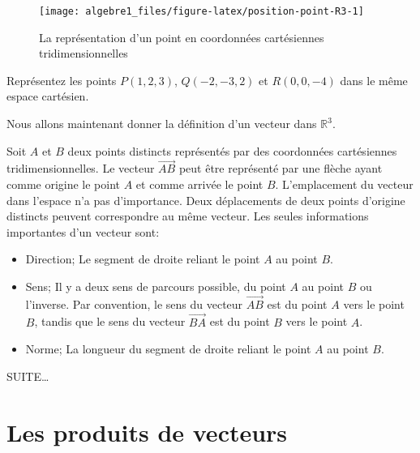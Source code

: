 \documentclass[]{book}
\providecommand{\tightlist}{%
  \setlength{\itemsep}{0pt}\setlength{\parskip}{0pt}}
\theoremstyle{definition}
\theoremstyle{definition}
\theoremstyle{definition}
\theoremstyle{remark}
\let\BeginKnitrBlock\begin \let\EndKnitrBlock\end
\begin{document}
\begin{figure}

{\centering \texttt{[image: algebre1\_files/figure-latex/position-point-R3-1]} 

}

\caption{La représentation d'un point en coordonnées cartésiennes tridimensionnelles}\label{fig:position-point-R3}
\end{figure}

\BeginKnitrBlock{example}
\protect\hypertarget{exm:unnamed-chunk-178}{}{\label{exm:unnamed-chunk-178} }Représentez les points \(P(1,2,3)\), \(Q(-2,-3,2)\) et \(R(0,0,-4)\) dans le même espace cartésien.
\EndKnitrBlock{example}

Nous allons maintenant donner la définition d'un vecteur dans \(\mathbb{R}^3\).

\BeginKnitrBlock{definition}[Les vecteurs de $\mathbb{R}^3$]
\protect\hypertarget{def:unnamed-chunk-179}{}{\label{def:unnamed-chunk-179} {} }Soit \(A\) et \(B\) deux points distincts représentés par des coordonnées cartésiennes tridimensionnelles. Le vecteur \(\overrightarrow{AB}\) peut être représenté par une flèche ayant comme origine le point \(A\) et comme arrivée le point \(B\). L'emplacement du vecteur dans l'espace n'a pas d'importance. Deux déplacements de deux points d'origine distincts peuvent correspondre au même vecteur. Les seules informations importantes d'un vecteur sont:

\begin{itemize}
\tightlist
\item
  Direction; Le segment de droite reliant le point \(A\) au point \(B\).
\item
  Sens; Il y a deux sens de parcours possible, du point \(A\) au point \(B\) ou l'inverse. Par convention, le sens du vecteur \(\overrightarrow{AB}\) est du point \(A\) vers le point \(B\), tandis que le sens du vecteur \(\overrightarrow{BA}\) est du point \(B\) vers le point \(A\).
\item
  Norme; La longueur du segment de droite reliant le point \(A\) au point \(B\).
\end{itemize}
\EndKnitrBlock{definition}

SUITE\ldots{}

\hypertarget{les-produits-de-vecteurs}{%
\section{Les produits de vecteurs}\label{les-produits-de-vecteurs}}
\end{document}
